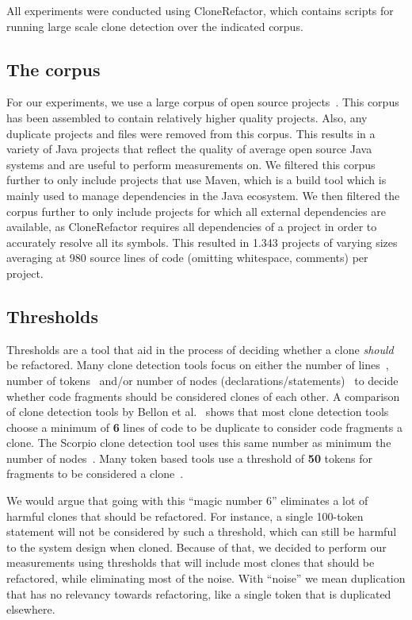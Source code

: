 \documentclass[a4paper]{article}
\begin{document}
All experiments were conducted using CloneRefactor, which contains scripts for running large scale clone detection over the indicated corpus.

\subsection{The corpus}\label{chap:corpus}
For our experiments, we use a large corpus of open source projects~\cite{githubCorpus2013}. This corpus has been assembled to contain relatively higher quality projects. Also, any duplicate projects and files were removed from this corpus. This results in a variety of Java projects that reflect the quality of average open source Java systems and are useful to perform measurements on. We filtered this corpus further to only include projects that use Maven, which is a build tool which is mainly used to manage dependencies in the Java ecosystem. We then filtered the corpus further to only include projects for which all external dependencies are available, as CloneRefactor requires all dependencies of a project in order to accurately resolve all its symbols. This resulted in 1.343 projects of varying sizes averaging at 980 source lines of code (omitting whitespace, comments) per project.

\subsection{Thresholds}\label{chap:thresholds}
Thresholds are a tool that aid in the process of deciding whether a clone \textit{should} be refactored. Many clone detection tools focus on either the number of lines~\cite{kamiya2002ccfinder, svajlenko2016bigcloneeval}, number of tokens~\cite{roy2008nicad, sajnani2016sourcerercc, ragkhitwetsagul2019siamese} and/or number of nodes (declarations/statements)~\cite{higo2013revisiting} to decide whether code fragments should be considered clones of each other. A comparison of clone detection tools by Bellon et al.~\cite{bellon2007comparison} shows that most clone detection tools choose a minimum of \textbf{6} lines of code to be duplicate to consider code fragments a clone. The Scorpio clone detection tool uses this same number as minimum the number of nodes~\cite{higo2013revisiting}. Many token based tools use a threshold of \textbf{50} tokens for fragments to be considered a clone~\cite{sajnani2016sourcerercc}.

We would argue that going with this ``magic number 6'' eliminates a lot of harmful clones that should be refactored. For instance, a single 100-token statement will not be considered by such a threshold, which can still be harmful to the system design when cloned. Because of that, we decided to perform our measurements using thresholds that will include most clones that should be refactored, while eliminating most of the noise. With ``noise'' we mean duplication that has no relevancy towards refactoring, like a single token that is duplicated elsewhere.
\end{document}

